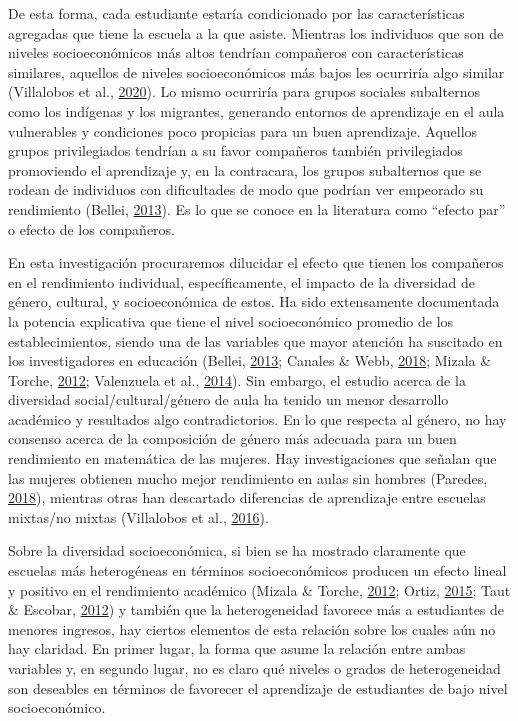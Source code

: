 \documentclass[
]{article}
\begin{document}
De esta forma, cada estudiante estaría condicionado por las
características agregadas que tiene la escuela a la que asiste. Mientras
los individuos que son de niveles socioeconómicos más altos tendrían
compañeros con características similares, aquellos de niveles
socioeconómicos más bajos les ocurriría algo similar (Villalobos et al.,
\protect\hyperlink{ref-villalobos_composicion_2020}{2020}). Lo mismo
ocurriría para grupos sociales subalternos como los indígenas y los
migrantes, generando entornos de aprendizaje en el aula vulnerables y
condiciones poco propicias para un buen aprendizaje. Aquellos grupos
privilegiados tendrían a su favor compañeros también privilegiados
promoviendo el aprendizaje y, en la contracara, los grupos subalternos
que se rodean de individuos con dificultades de modo que podrían ver
empeorado su rendimiento (Bellei,
\protect\hyperlink{ref-bellei_estudio_2013}{2013}). Es lo que se conoce
en la literatura como ``efecto par'' o efecto de los compañeros.

En esta investigación procuraremos dilucidar el efecto que tienen los
compañeros en el rendimiento individual, específicamente, el impacto de
la diversidad de género, cultural, y socioeconómica de estos. Ha sido
extensamente documentada la potencia explicativa que tiene el nivel
socioeconómico promedio de los establecimientos, siendo una de las
variables que mayor atención ha suscitado en los investigadores en
educación (Bellei, \protect\hyperlink{ref-bellei_estudio_2013}{2013};
Canales \& Webb, \protect\hyperlink{ref-canales_educational_2018}{2018};
Mizala \& Torche, \protect\hyperlink{ref-mizala_bringing_2012}{2012};
Valenzuela et al.,
\protect\hyperlink{ref-valenzuela_socioeconomic_2014}{2014}). Sin
embargo, el estudio acerca de la diversidad social/cultural/género de
aula ha tenido un menor desarrollo académico y resultados algo
contradictorios. En lo que respecta al género, no hay consenso acerca de
la composición de género más adecuada para un buen rendimiento en
matemática de las mujeres. Hay investigaciones que señalan que las
mujeres obtienen mucho mejor rendimiento en aulas sin hombres (Paredes,
\protect\hyperlink{ref-paredes_mixed_2018}{2018}), mientras otras han
descartado diferencias de aprendizaje entre escuelas mixtas/no mixtas
(Villalobos et al.,
\protect\hyperlink{ref-villalobos_composicion_2016}{2016}).

Sobre la diversidad socioeconómica, si bien se ha mostrado claramente
que escuelas más heterogéneas en términos socioeconómicos producen un
efecto lineal y positivo en el rendimiento académico (Mizala \& Torche,
\protect\hyperlink{ref-mizala_bringing_2012}{2012}; Ortiz,
\protect\hyperlink{ref-ortiz_escuelas_2015}{2015}; Taut \& Escobar,
\protect\hyperlink{ref-taut_efecto_2012}{2012}) y también que la
heterogeneidad favorece más a estudiantes de menores ingresos, hay
ciertos elementos de esta relación sobre los cuales aún no hay claridad.
En primer lugar, la forma que asume la relación entre ambas variables y,
en segundo lugar, no es claro qué niveles o grados de heterogeneidad son
deseables en términos de favorecer el aprendizaje de estudiantes de bajo
nivel socioeconómico.
\end{document}
